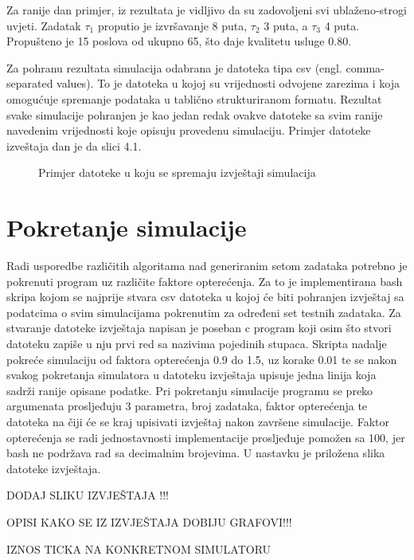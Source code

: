 \documentclass[../zavrsni.tex]{subfiles}
\begin{document}
Za ranije dan primjer, iz rezultata je vidljivo da su zadovoljeni svi ublaženo-strogi uvjeti. Zadatak $\tau_1$ 
proputio je izvršavanje 8 puta, $\tau_2$ 3 puta, a $\tau_3$ 4 puta. Propušteno je 15 poslova od ukupno 65, što
daje kvalitetu usluge 0.80. 

Za pohranu rezultata simulacija odabrana je datoteka tipa csv (engl. comma-separated values). To je datoteka u kojoj su vrijednosti odvojene zarezima 
i koja omogućuje spremanje podataka u tablično strukturiranom formatu. Rezultat svake simulacije pohranjen je kao jedan redak ovakve datoteke sa svim ranije 
navedenim vrijednosti koje opisuju provedenu simulaciju. Primjer datoteke izveštaja dan je da slici 4.1.

\begin{figure}[!htb]
    \caption{\label{fig:my-label} Primjer datoteke u koju se spremaju izvještaji simulacija}
  \end{figure}

\section{Pokretanje simulacije}

Radi usporedbe različitih algoritama nad generiranim setom zadataka potrebno je pokrenuti program uz različite faktore opterećenja. 
Za to je implementirana bash skripa kojom se najprije stvara csv datoteka u kojoj će biti pohranjen izvještaj sa podatcima o 
svim simulacijama pokrenutim za određeni set testnih zadataka. Za stvaranje datoteke izvještaja napisan je poseban c program koji osim što
stvori datoteku zapiše u nju prvi red sa nazivima pojedinih stupaca.
Skripta nadalje pokreće simulaciju od faktora opterećenja 0.9 do 1.5, uz korake 0.01 te se nakon svakog pokretanja simulatora u 
datoteku izvještaja upisuje jedna linija koja sadrži ranije opisane podatke.
Pri pokretanju simulacije programu se preko argumenata prosljeđuju 3 parametra, broj zadataka, 
faktor opterećenja te datoteka na čiji će se kraj upisivati izvještaj nakon završene simulacije.
Faktor opterećenja se radi jednostavnosti implementacije prosljeđuje pomožen sa 100, jer bash ne podržava rad sa decimalnim brojevima.
U nastavku je priložena slika datoteke izvještaja.

DODAJ SLIKU IZVJEŠTAJA !!!

OPISI KAKO SE IZ IZVJEŠTAJA DOBIJU GRAFOVI!!!

IZNOS TICKA NA KONKRETNOM SIMULATORU
\end{document}
